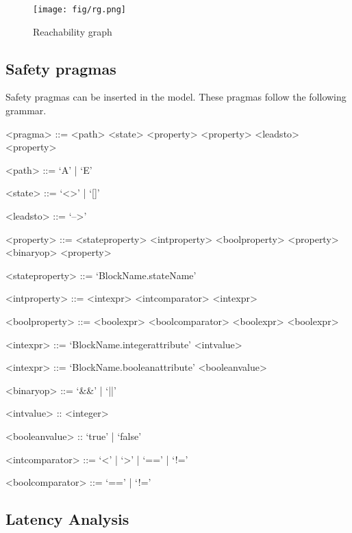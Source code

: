 \documentclass[12pt]{article}
\begin{document}
\begin{figure*}[htbp]
\centering
\texttt{[image: fig/rg.png]}
\caption{Reachability graph} \label{fig:rg}
\end{figure*}

\subsection{Safety pragmas}
Safety pragmas can be inserted in the model. These pragmas follow the following grammar.

\setlength{\grammarparsep}{20pt plus 1pt minus 1pt} %
\setlength{\grammarindent}{12em} %

\begin{grammar}

<pragma> ::= <path> <state> <property> 
\alt <property> <leadsto> <property> 

<path> ::=  `A'  |   `E' 

<state> ::=  `<>'  |   `[]' 

<leadsto> ::=  `-->'  

<property> ::= <stateproperty>
\alt <intproperty>
\alt <boolproperty>
\alt <property> <binaryop> <property>

<stateproperty> ::= `BlockName.stateName' 

<intproperty> ::= <intexpr> <intcomparator> <intexpr>

<boolproperty> ::= <boolexpr> <boolcomparator> <boolexpr>
\alt <boolexpr>



<intexpr> ::= `BlockName.integerattribute' 
\alt <intvalue>

<intexpr> ::= `BlockName.booleanattribute' 
\alt <booleanvalue>


<binaryop>  ::=  `&&'  |   `||' 

<intvalue> :: <integer>

<booleanvalue> :: `true' | `false'

<intcomparator>  ::=  `<'  |   `>'  | `=='  |   `!=' 

<boolcomparator> ::=  `=='  |   `!=' 

\end{grammar}

\subsection{Latency Analysis}
\end{document}
